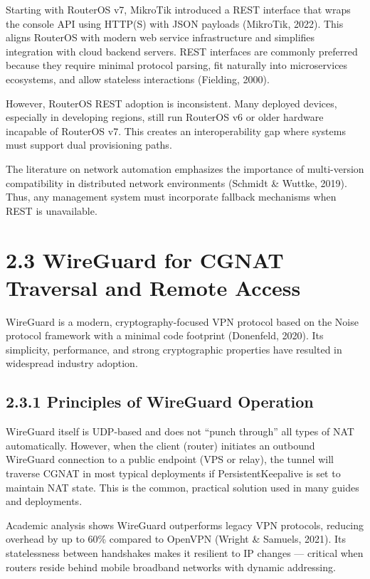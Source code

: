 \documentclass[12pt,a4paper,oneside]{report}
\begin{document}
Starting with RouterOS v7, MikroTik introduced a REST interface that wraps the console API using HTTP(S) with JSON payloads (MikroTik, 2022). This aligns RouterOS with modern web service infrastructure and simplifies integration with cloud backend servers. REST interfaces are commonly preferred because they require minimal protocol parsing, fit naturally into microservices ecosystems, and allow stateless interactions (Fielding, 2000).

However, RouterOS REST adoption is inconsistent. Many deployed devices, especially in developing regions, still run RouterOS v6 or older hardware incapable of RouterOS v7. This creates an interoperability gap where systems must support dual provisioning paths.

The literature on network automation emphasizes the importance of multi-version compatibility in distributed network environments (Schmidt \& Wuttke, 2019). Thus, any management system must incorporate fallback mechanisms when REST is unavailable.

\section{2.3 WireGuard for CGNAT Traversal and Remote Access}

WireGuard is a modern, cryptography-focused VPN protocol based on the Noise protocol framework with a minimal code footprint (Donenfeld, 2020). Its simplicity, performance, and strong cryptographic properties have resulted in widespread industry adoption.

\subsection{2.3.1 Principles of WireGuard Operation}

WireGuard itself is UDP-based and does not ``punch through'' all types of NAT automatically. However, when the client (router) initiates an outbound WireGuard connection to a public endpoint (VPS or relay), the tunnel will traverse CGNAT in most typical deployments if PersistentKeepalive is set to maintain NAT state. This is the common, practical solution used in many guides and deployments.

Academic analysis shows WireGuard outperforms legacy VPN protocols, reducing overhead by up to 60\% compared to OpenVPN (Wright \& Samuels, 2021). Its statelessness between handshakes makes it resilient to IP changes --- critical when routers reside behind mobile broadband networks with dynamic addressing.
\end{document}
